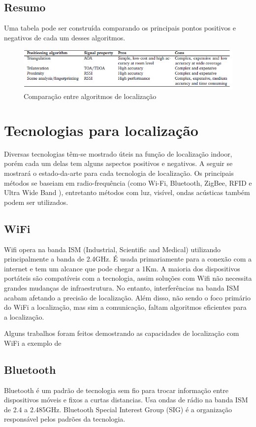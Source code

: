 \subsection{Resumo}

Uma tabela pode ser construída comparando os principais pontos positivos e negativos de cada um desses algoritmos.
\begin{figure}[H]
	\centering 
	\includegraphics[scale = 1]{images/algorithms_table.png}
	\caption{Comparação entre algoritmos de localização \cite{art1}}
	\label{fig:algorithms_table.png}
\end{figure}

\section{Tecnologias para localização}
Diversas tecnologias têm-se mostrado úteis na função de localização indoor, porém cada um delas tem alguns aspectos positivos e negativos. A seguir se mostrará o estado-da-arte para cada tecnologia de localização. Os principais métodos se baseiam em radio-frequência (como Wi-Fi, Bluetooth, ZigBee, RFID e Ultra Wide Band ), entretanto métodos com luz, visível, ondas acústicas também podem ser utilizados.

\subsection{WiFi}
Wifi opera na banda ISM (Industrial, Scientific and Medical) utilizando principalmente a banda de 2.4GHz. É usada primariamente para a conexão com a internet e tem um alcance que pode chegar a 1Km. A maioria dos dispositivos portáteis são compatíveis com a tecnologia, assim soluções com Wifi não necessita grandes mudanças de infraestrutura. No entanto, interferências na banda ISM acabam afetando a precisão de localização. Além disso, não sendo o foco primário do WiFi a localização, mas sim a comunicação, faltam algoritmos eficientes para a localização.

Alguns trabalhos foram feitos demostrando as capacidades de localização com WiFi a exemplo de \cite{art7}

\subsection{Bluetooth}
Bluetooth é um padrão de tecnologia sem fio para trocar informação entre dispositivos móveis e fixos a curtas distancias. Usa ondas de rádio na banda ISM de 2.4 a 2.485GHz. Bluetooth Special Interest Group (SIG) é a organização responsável pelos padrões da tecnologia.


